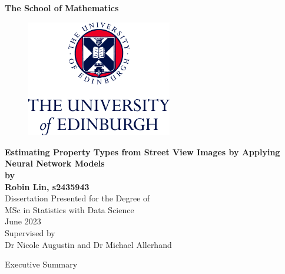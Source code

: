 \documentclass[11pt,twoside]{article}
\numberwithin{Theorem}{section}
\numberwithin{Definition}{section}
\numberwithin{Lemma}{section}
\numberwithin{Algorithm}{section}
\numberwithin{equation}{section}
\begin{document}
\pagestyle{empty}

\begin{titlepage}
\vspace*{.5em}
\center
\textbf{\Large{The School of Mathematics}} \\
\vspace*{1em}
\begin{figure}[!h]
\centering
\includegraphics[width=180pt]{CentredLogoCMYK.jpg}
\end{figure}
\vspace{2em}
\textbf{\Huge{Estimating Property Types from Street View Images by Applying Neural Network Models}}\\[2em]
\textbf{\LARGE{by}}\\
\vspace{2em}
\textbf{\LARGE{Robin Lin, s2435943}}\\
\vspace{6.5em}
\Large{Dissertation Presented for the Degree of\\
MSc in Statistics with Data Science}\\
\vspace{6.5em}
\Large{June 2023}\\
\vspace{3em}
\Large{Supervised by\\Dr Nicole Augustin and Dr Michael Allerhand}
\vfill
\end{titlepage}

\cleardoublepage

\begin{center}
\Large{Executive Summary}
\end{center}
\end{document}
